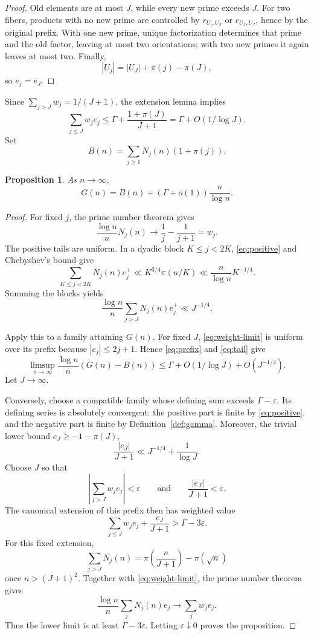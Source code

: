 \documentclass[11pt,reqno]{article}
\newtheorem{proposition}[theorem]{Proposition}
\theoremstyle{definition}
\begin{document}
\begin{proof}
Old elements are at most \(J\), while every new prime exceeds \(J\).
For two fibers, products with no new prime are controlled by
\(r_{U_i,U_J}\) or \(r_{U_J,U_J}\), hence by the original prefix.  With one
new prime, unique factorization determines that prime and the old factor,
leaving at most two orientations; with two new primes it again leaves at
most two.  Finally,
\[
 |U_j|=|U_J|+\pi(j)-\pi(J),
\]
so \(e_j=e_J\).
\end{proof}

Since \(\sum_{j>J}w_j=1/(J+1)\), the extension lemma implies
\begin{equation}\label{eq:prefix}
  \sum_{j\leq J}w_je_j
  \leq\Gamma+\frac{1+\pi(J)}{J+1}
  =\Gamma+O(1/\log J).
\end{equation}
Set
\[
  B(n)=\sum_{j\geq1}N_j(n)(1+\pi(j)).
\]

\begin{proposition}\label{prop:model-limit}
As \(n\to\infty\),
\[
  G(n)=B(n)+(\Gamma+o(1))\frac n{\log n}.
\]
\end{proposition}

\begin{proof}
For fixed \(j\), the prime number theorem gives
\begin{equation}\label{eq:weight-limit}
  \frac{\log n}{n}N_j(n)\longrightarrow
  \frac1j-\frac1{j+1}=w_j.
\end{equation}
The positive tails are uniform.  In a dyadic block \(K\leq j<2K\),
\eqref{eq:positive} and Chebyshev's bound give
\[
  \sum_{K\leq j<2K}N_j(n)e_j^+
  \ll K^{3/4}\pi(n/K)
  \ll\frac n{\log n}K^{-1/4}.
\]
Summing the blocks yields
\begin{equation}\label{eq:tail}
  \frac{\log n}{n}\sum_{j>J}N_j(n)e_j^+
  \ll J^{-1/4}.
\end{equation}

Apply this to a family attaining \(G(n)\).  For fixed \(J\),
\eqref{eq:weight-limit} is uniform over its prefix because
\(|e_j|\leq2j+1\).  Hence \eqref{eq:prefix} and \eqref{eq:tail} give
\[
  \limsup_{n\to\infty}\frac{\log n}{n}(G(n)-B(n))
  \leq\Gamma+O(1/\log J)+O(J^{-1/4}).
\]
Let \(J\to\infty\).

Conversely, choose a compatible family whose defining sum exceeds
\(\Gamma-\varepsilon\).  Its defining series is absolutely convergent: the
positive part is finite by \eqref{eq:positive}, and the negative part is
finite by Definition~\ref{def:gamma}.  Moreover, the trivial lower bound
\(e_J\geq-1-\pi(J)\),
\[
  \frac{|e_J|}{J+1}\ll J^{-1/4}+\frac1{\log J}.
\]
Choose \(J\) so that
\[
  \left|\sum_{j>J}w_je_j\right|<\varepsilon
  \qquad\text{and}\qquad
  \frac{|e_J|}{J+1}<\varepsilon.
\]
The canonical extension of this prefix then has weighted value
\[
  \sum_{j\leq J}w_je_j+\frac{e_J}{J+1}
  >\Gamma-3\varepsilon.
\]
For this fixed extension,
\[
  \sum_{j>J}N_j(n)
  =\pi\left(\frac n{J+1}\right)-\pi(\sqrt n)
\]
once \(n>(J+1)^2\).  Together with \eqref{eq:weight-limit}, the prime number
theorem gives
\[
  \frac{\log n}{n}\sum_jN_j(n)e_j
  \longrightarrow\sum_jw_je_j.
\]
Thus the lower limit is at least
\(\Gamma-3\varepsilon\).  Letting \(\varepsilon\downarrow0\) proves the
proposition.
\end{proof}
\end{document}

